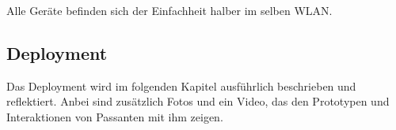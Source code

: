Alle Geräte befinden sich der Einfachheit halber im selben WLAN.

\subsection{Deployment}\label{deployment}

Das Deployment wird im folgenden Kapitel ausführlich beschrieben und reflektiert.
Anbei sind zusätzlich Fotos und ein Video, das den Prototypen und Interaktionen von Passanten mit ihm zeigen.